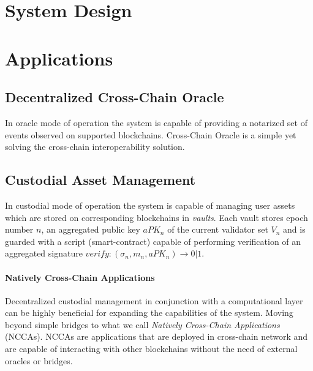 \documentclass{article}
\begin{document}
\begin{sloppypar}
        \section{System Design}\label{sec:system-design}
        


        \section{Applications}\label{sec:applications}

        \subsection{Decentralized Cross-Chain Oracle}\label{subsec:cross-chain-oracle}
        In oracle mode of operation the system is capable of providing a notarized set of events observed on supported blockchains.
        Cross-Chain Oracle is a simple yet solving the cross-chain interoperability solution.

        \subsection{Custodial Asset Management}\label{subsec:custodial-asset-management}
        In custodial mode of operation the system is capable of managing user assets which are stored on corresponding blockchains in \emph{vaults}.
        Each vault stores epoch number $n$, an aggregated public key $aPK_n$ of the current validator set $V_n$ and
        is guarded with a script (smart-contract) capable of performing verification of
        an aggregated signature ${verify: (\sigma_n, m_n, aPK_n) \rightarrow 0 | 1}$.

        \paragraph{Natively Cross-Chain Applications}
        Decentralized custodial management in conjunction with a computational layer can be highly beneficial for expanding the capabilities of the system.
        Moving beyond simple bridges to what we call \emph{Natively Cross-Chain Applications} (NCCAs).
        NCCAs are applications that are deployed in cross-chain network and are capable of interacting with other blockchains without the need of external oracles or bridges.

        \newpage

        \printbibliography
    \end{sloppypar}
\end{document}
